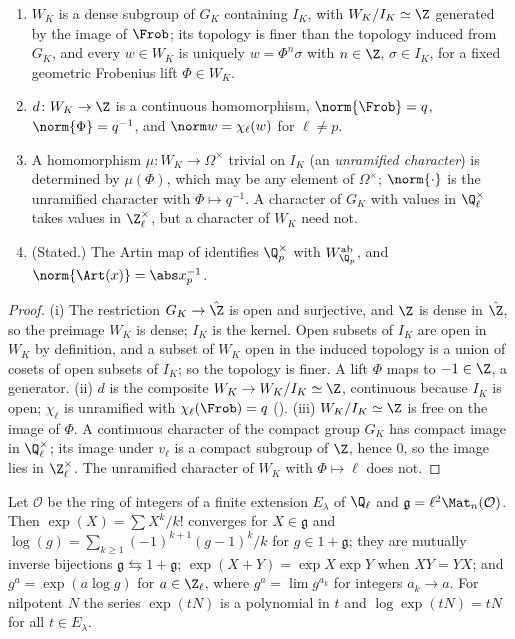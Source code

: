 \begin{proposition}\label{prop:local:weil-group}
\begin{enumerate}[label=(\roman*)]
\item $W_K$ is a dense subgroup of $G_K$ containing $I_K$, with $W_K/I_K\simeq\Z$ generated by the image of $\Frob$; its topology is finer than the
topology induced from $G_K$, and every $w\in W_K$ is uniquely $w=\Phi^n\sigma$ with $n\in\Z$, $\sigma\in I_K$, for a fixed geometric Frobenius lift $\Phi\in W_K$.
\item $d\colon W_K\to\Z$ is a continuous homomorphism, $\norm{\Frob}=q$, $\norm{\Phi}=q^{-1}$, and $\norm w=\chi_\ell(w)$ for $\ell\ne p$.
\item A homomorphism $\mu\colon W_K\to\Omega^\times$ trivial on $I_K$ (an \emph{unramified character}) is determined by $\mu(\Phi)$, which may be any element of
$\Omega^\times$; $\norm{\cdot}$ is the unramified character with $\Phi\mapsto q^{-1}$. A character of $G_K$ with values in $\Q_\ell^\times$ takes values in $\Z_\ell^\times$, but a
character of $W_K$ need not.
\item (Stated.) The Artin map of  identifies $\Q_p^\times$ with $W_{\Q_p}^{\mathrm{ab}}$, and $\norm{\Art(x)}=\abs x_p^{-1}$.
\end{enumerate}
\end{proposition}

\begin{proof}
(i) The restriction $G_K\to\hat\Z$ is open and surjective, and $\Z$ is dense in $\hat\Z$, so the preimage $W_K$ is dense; $I_K$ is the kernel. Open subsets of
$I_K$ are open in $W_K$ by definition, and a subset of $W_K$ open in the induced topology is a union of cosets of open subsets of $I_K$; so the
topology is finer. A lift $\Phi$ maps to $-1\in\Z$, a generator. (ii) $d$ is the composite $W_K\to W_K/I_K\simeq\Z$, continuous because $I_K$ is open; $\chi_\ell$ is
unramified with $\chi_\ell(\Frob)=q$ (). (iii) $W_K/I_K\simeq\Z$ is free on the image of $\Phi$. A continuous character of the
compact group $G_K$ has compact image in $\Q_\ell^\times$; its image under $v_\ell$ is a compact subgroup of $\Z$, hence $0$, so the image lies in $\Z_\ell^\times$.
The unramified character of $W_K$ with $\Phi\mapsto\ell$ does not.
\end{proof}

\begin{lemma}\label{lem:local:matrix-log}
Let $\mathcal O$ be the ring of integers of a finite extension $E_\lambda$ of $\Q_\ell$ and $\mathfrak g=\ell^2\Mat_n(\mathcal O)$. Then $\exp(X)=\sum X^k/k!$ converges for
$X\in\mathfrak g$ and $\log(g)=\sum_{k\ge1}(-1)^{k+1}(g-1)^k/k$ for $g\in1+\mathfrak g$; they are mutually inverse bijections $\mathfrak g\leftrightarrows1+\mathfrak g$;
$\exp(X+Y)=\exp X\exp Y$ when $XY=YX$; and $g^a=\exp(a\log g)$ for $a\in\Z_\ell$, where $g^a=\lim g^{a_k}$ for integers $a_k\to a$. For nilpotent $N$ the
series $\exp(tN)$ is a polynomial in $t$ and $\log\exp(tN)=tN$ for all $t\in E_\lambda$.
\end{lemma}

